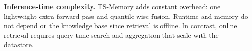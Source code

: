 \noindent\textbf{Inference-time complexity.} TS-Memory adds constant overhead: one lightweight extra forward pass and quantile-wise fusion. Runtime and memory do not depend on the knowledge base since retrieval is offline. In contrast, online retrieval requires query-time search and aggregation that scale with the datastore.
